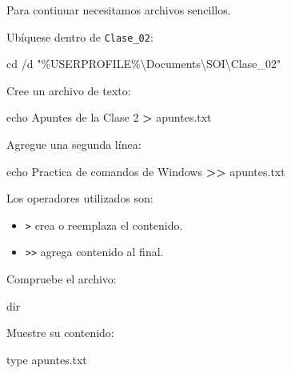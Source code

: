 \documentclass[
  spanish,
  letterpaper,
]{scrbook}
\newenvironment{Shaded}{\begin{snugshade}}{\end{snugshade}}
\newcommand{\AttributeTok}[1]{\textcolor[rgb]{0.40,0.45,0.13}{#1}}
\newcommand{\BuiltInTok}[1]{\textcolor[rgb]{0.00,0.23,0.31}{#1}}
\newcommand{\KeywordTok}[1]{\textcolor[rgb]{0.00,0.23,0.31}{\textbf{#1}}}
\newcommand{\NormalTok}[1]{\textcolor[rgb]{0.00,0.23,0.31}{#1}}
\newcommand{\PreprocessorTok}[1]{\textcolor[rgb]{0.68,0.00,0.00}{#1}}
\newcommand{\StringTok}[1]{\textcolor[rgb]{0.13,0.47,0.30}{#1}}
\newcommand{\VariableTok}[1]{\textcolor[rgb]{0.07,0.07,0.07}{#1}}
\providecommand{\tightlist}{%
  \setlength{\itemsep}{0pt}\setlength{\parskip}{0pt}}
\begin{document}
Para continuar necesitamos archivos sencillos.

Ubíquese dentro de \texttt{Clase\_02}:

\begin{Shaded}
\begin{Highlighting}[]
\BuiltInTok{cd} \AttributeTok{/d} \StringTok{"}\PreprocessorTok{\%}\VariableTok{USERPROFILE}\PreprocessorTok{\%}\StringTok{\textbackslash{}Documents\textbackslash{}SOI\textbackslash{}Clase\_02"}
\end{Highlighting}
\end{Shaded}

Cree un archivo de texto:

\begin{Shaded}
\begin{Highlighting}[]
\BuiltInTok{echo}\NormalTok{ Apuntes de la Clase 2 }\KeywordTok{\textgreater{}}\NormalTok{ apuntes.txt}
\end{Highlighting}
\end{Shaded}

Agregue una segunda línea:

\begin{Shaded}
\begin{Highlighting}[]
\BuiltInTok{echo}\NormalTok{ Practica de comandos de Windows }\KeywordTok{\textgreater{}\textgreater{}}\NormalTok{ apuntes.txt}
\end{Highlighting}
\end{Shaded}

Los operadores utilizados son:

\begin{itemize}
\tightlist
\item
  \texttt{\textgreater{}} crea o reemplaza el contenido.
\item
  \texttt{\textgreater{}\textgreater{}} agrega contenido al final.
\end{itemize}

Compruebe el archivo:

\begin{Shaded}
\begin{Highlighting}[]
\BuiltInTok{dir}
\end{Highlighting}
\end{Shaded}

Muestre su contenido:

\begin{Shaded}
\begin{Highlighting}[]
\BuiltInTok{type}\NormalTok{ apuntes.txt}
\end{Highlighting}
\end{Shaded}
\end{document}

